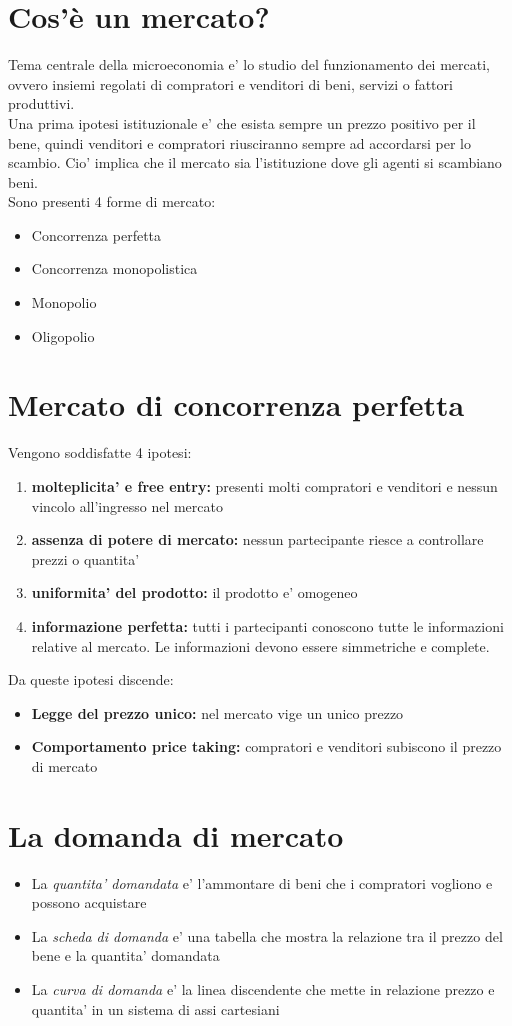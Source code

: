 \documentclass{report}
\begin{document}
	\section{Cos'è un mercato?}
	Tema centrale della microeconomia e' lo studio del funzionamento dei mercati, ovvero insiemi regolati di compratori e venditori di beni, servizi o fattori produttivi.\medskip \\Una prima ipotesi istituzionale e' che esista sempre un prezzo positivo per il bene, quindi venditori e compratori riusciranno sempre ad accordarsi per lo scambio. Cio' implica che il mercato sia l'istituzione dove gli agenti si scambiano beni.
	\medskip \\Sono presenti 4 forme di mercato:
	\begin{itemize}
		\item Concorrenza perfetta
		\item Concorrenza monopolistica
		\item Monopolio
		\item Oligopolio
	\end{itemize}
	\section{Mercato di concorrenza perfetta}
	Vengono soddisfatte 4 ipotesi:
	\begin{enumerate}
		\item \textbf{molteplicita' e free entry:} presenti molti compratori e venditori e nessun vincolo all'ingresso nel mercato
		\item \textbf{assenza di potere di mercato:} nessun partecipante riesce a controllare prezzi o quantita'
		\item \textbf{uniformita' del prodotto:} il prodotto e' omogeneo
		\item \textbf{informazione perfetta:} tutti i partecipanti conoscono tutte le informazioni relative al mercato. Le informazioni devono essere simmetriche e complete.
	\end{enumerate}
	Da queste ipotesi discende:
	\begin{itemize}
		\item \textbf{Legge del prezzo unico:} nel mercato vige un unico prezzo
		\item \textbf{Comportamento price taking:} compratori e venditori subiscono il prezzo di mercato
	\end{itemize}
	\section{La domanda di mercato}
	\begin{itemize}
		\item La \textit{quantita' domandata} e' l'ammontare di beni che i compratori vogliono e possono acquistare
		\item La \textit{scheda di domanda} e' una tabella che mostra la relazione tra il prezzo del bene e la quantita' domandata
		\item La \textit{curva di domanda} e' la linea discendente che mette in relazione prezzo e quantita' in un sistema di assi cartesiani
	\end{itemize}
\end{document}
